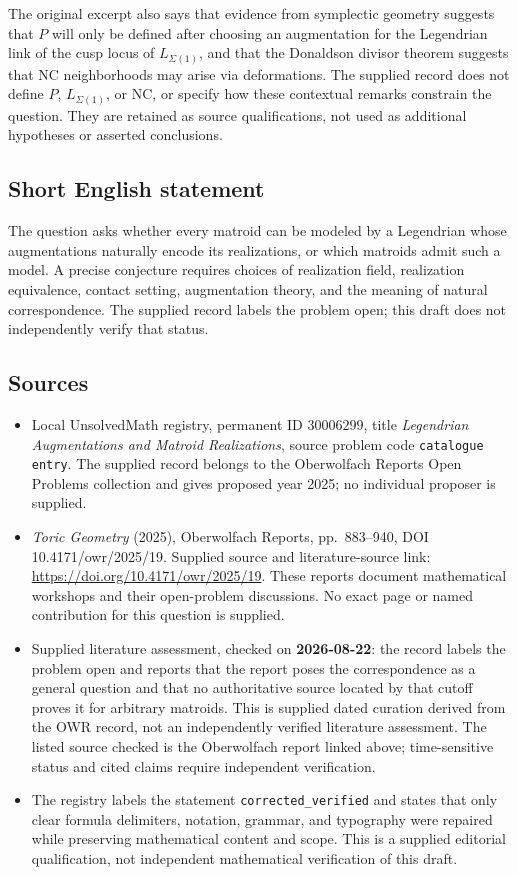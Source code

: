 \documentclass[11pt]{article}
\begin{document}
The original excerpt also says that evidence from symplectic geometry suggests that \(P\) will only be defined after choosing an augmentation for the Legendrian link of the cusp locus of \(L_{\Sigma(1)}\), and that the Donaldson divisor theorem suggests that \(\mathrm{NC}\) neighborhoods may arise via deformations. The supplied record does not define \(P\), \(L_{\Sigma(1)}\), or \(\mathrm{NC}\), or specify how these contextual remarks constrain the question. They are retained as source qualifications, not used as additional hypotheses or asserted conclusions.
\subsection{Short English statement}
The question asks whether every matroid can be modeled by a Legendrian whose augmentations naturally encode its realizations, or which matroids admit such a model. A precise conjecture requires choices of realization field, realization equivalence, contact setting, augmentation theory, and the meaning of natural correspondence. The supplied record labels the problem open; this draft does not independently verify that status.
\subsection{Sources}
\begin{itemize}
\item Local UnsolvedMath registry, permanent ID \(30006299\), title \emph{Legendrian Augmentations and Matroid Realizations}, source problem code \texttt{catalogue entry}. The supplied record belongs to the Oberwolfach Reports Open Problems collection and gives proposed year 2025; no individual proposer is supplied.
\item \emph{Toric Geometry} (2025), Oberwolfach Reports, pp.~883--940, DOI 10.4171/owr/2025/19. Supplied source and literature-source link: \url{https://doi.org/10.4171/owr/2025/19}. These reports document mathematical workshops and their open-problem discussions. No exact page or named contribution for this question is supplied.
\item Supplied literature assessment, checked on \textbf{2026-08-22}: the record labels the problem open and reports that the report poses the correspondence as a general question and that no authoritative source located by that cutoff proves it for arbitrary matroids. This is supplied dated curation derived from the OWR record, not an independently verified literature assessment. The listed source checked is the Oberwolfach report linked above; time-sensitive status and cited claims require independent verification.
\item The registry labels the statement \texttt{corrected\_verified} and states that only clear formula delimiters, notation, grammar, and typography were repaired while preserving mathematical content and scope. This is a supplied editorial qualification, not independent mathematical verification of this draft.
\end{itemize}
\end{document}
